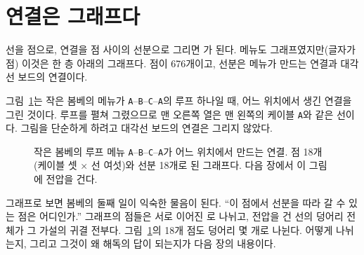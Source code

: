 \section{연결은 그래프다}\label{sec:c-graph}

선을 점으로, 연결을 점 사이의 선분으로 그리면 가 된다. 메뉴도 그래프였지만(글자가 점) 이것은
한 층 아래의 그래프다. 점이 676개이고, 선분은 메뉴가 만드는 연결과 대각선 보드의 연결이다.

그림~\ref{fig:c-graph}는 작은 봄베의 메뉴가 \texttt{A}--\texttt{B}--\texttt{C}--\texttt{A}의 루프 하나일 때, 어느
위치에서 생긴 연결을 그린 것이다. 루프를 펼쳐 그렸으므로 맨 오른쪽 열은 맨 왼쪽의 케이블 \texttt{A}와 같은 선이다.
그림을 단순하게 하려고 대각선 보드의 연결은 그리지 않았다.

\begin{figure}[ht]
\centering
{}
\caption{작은 봄베의 루프 메뉴 \texttt{A}--\texttt{B}--\texttt{C}--\texttt{A}가 어느 위치에서 만드는 연결. 점 18개(케이블 셋 × 선
여섯)와 선분 18개로 된 그래프다. 다음 장에서 이 그림에 전압을 건다.}
\label{fig:c-graph}
\end{figure}

\Why 그래프로 보면 봄베의 둘째 일이 익숙한 물음이 된다. ``이 점에서 선분을 따라 갈 수 있는 점은 어디인가.''
그래프의 점들은 서로 이어진 로 나뉘고, 전압을 건 선의 덩어리 전체가 그 가설의 귀결
전부다. 그림~\ref{fig:c-graph}의 18개 점도 덩어리 몇 개로 나뉜다. 어떻게 나뉘는지, 그리고 그것이 왜 해독의 답이
되는지가 다음 장의 내용이다.

